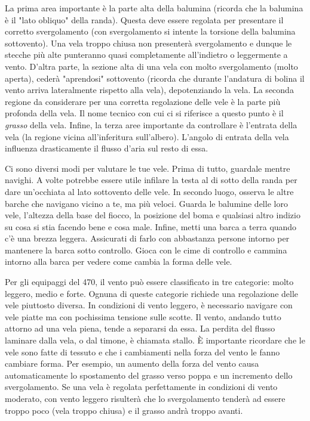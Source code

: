 La prima area importante è la parte alta della balumina (ricorda che la balumina
è il "lato obliquo" della randa). Questa deve essere
regolata per presentare il corretto svergolamento (con svergolamento si intente
la torsione della balumina sottovento). Una vela
troppo chiusa non presenterà svergolamento e dunque le stecche più alte punteranno quasi
completamente all'indietro o leggermente a vento. D'altra parte, la sezione alta di una vela con
molto svergolamento (molto aperta), cederà "aprendosi" sottovento (ricorda che
durante l'andatura di bolina il vento arriva lateralmente rispetto alla vela),
depotenziando la vela.
%
La seconda regione da considerare per una corretta regolazione delle vele è la
parte più profonda della vela. Il nome tecnico con cui ci si riferisce a questo
punto è il \emph{grasso} della vela.
%
Infine, la terza aree importante da controllare è l'entrata della vela (la
regione vicina all'inferitura sull'albero). L'angolo di entrata della vela
influenza drasticamente il flusso d'aria sul resto di essa.

Ci sono diversi modi per valutare le tue vele. Prima di tutto, guardale
mentre navighi. A volte potrebbe essere utile infilare la testa al di sotto della randa
per dare un'occhiata al lato sottovento delle vele. In secondo luogo, osserva le
altre barche che navigano vicino a te, ma più veloci. Guarda le balumine delle
loro vele, l'altezza della base del fiocco, la posizione del boma
e qualsiasi altro indizio su cosa si stia facendo bene e cosa male. Infine,
metti una barca a terra quando c'è una brezza leggera. Assicurati di farlo con
abbastanza persone intorno per mantenere la barca sotto controllo. Gioca con le
cime di controllo e cammina intorno alla barca per vedere come cambia la forma
delle vele.

Per gli equipaggi del 470, il vento può essere classificato in tre categorie:
molto leggero, medio e forte. Ognuna di queste categorie richiede una
regolazione delle vele piuttosto diversa. In condizioni di vento leggero, è
necessario navigare con vele piatte ma con pochissima tensione sulle scotte. Il
vento, andando tutto attorno ad una vela piena, tende a separarsi da essa. La
perdita del flusso laminare dalla vela, o dal timone, è chiamata stallo. È
importante ricordare che le vele sono fatte di tessuto e che i cambiamenti nella
forza del vento le fanno cambiare forma. Per esempio, un aumento della forza del
vento causa automaticamente lo spostamento del grasso verso poppa e un
incremento dello svergolamento. Se una vela è regolata perfettamente in
condizioni di vento moderato, con vento leggero risulterà che lo
svergolamento tenderà ad essere troppo poco (vela troppo chiusa) e il grasso
andrà troppo avanti.

